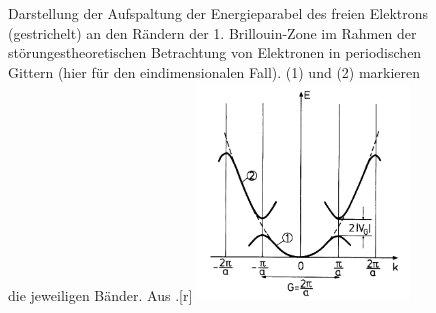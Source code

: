 \begin{figure}[!t]
  \begin{captionbeside}[]{Darstellung der Aufspaltung der Energieparabel des freien Elektrons 
(gestrichelt) an den Rändern der 1. Brillouin-Zone im Rahmen der störungestheoretischen 
Betrachtung von Elektronen in periodischen Gittern (hier für den eindimensionalen Fall). 
(1) und (2) markieren die jeweiligen Bänder. 
Aus \cite{ibach2009festkorperphysik}.}[r]
    \includegraphics[width=0.5\textwidth]{pics/bloch}
  \end{captionbeside}
  \label{fig:bloch}
\end{figure}

